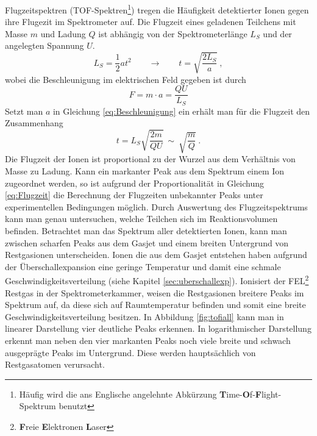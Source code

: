 Flugzeitspektren (TOF-Spektren\footnote{Häufig wird die ans Englische angelehnte Abkürzung \textbf{T}ime-\textbf{O}f-\textbf{F}light-Spektrum benutzt}) tregen die Häufigkeit detektierter Ionen gegen ihre Flugezit im Spektrometer auf. Die Flugzeit eines geladenen Teilchens mit Masse $m$ und Ladung $Q$ ist abhängig von der Spektrometerlänge $L_S$ und der angelegten Spannung $U$.
\begin{equation} \label{eq:Beschleunigung}
L_S = \frac{1}{2}at^2\qquad \rightarrow \qquad t = \sqrt{\frac{2L_S}{a}} \: ,
\end{equation} 
wobei die Beschleunigung im elektrischen Feld gegeben ist durch
\begin{equation}
F = m \cdot a = \frac{QU}{L_S}
\end{equation}
Setzt man $a$ in Gleichung \ref{eq:Beschleunigung} ein erhält man für die Flugzeit den Zusammenhang 
\begin{equation} \label{eq:Flugzeit}
t = L_S \sqrt{\frac{2m}{QU}}\: \sim \: \sqrt{\frac{m}{Q}} \: .
\end{equation}
Die Flugzeit der Ionen ist proportional zu der Wurzel aus dem Verhältnis von Masse zu Ladung. Kann ein markanter Peak aus dem Spektrum einem Ion zugeordnet werden, so ist aufgrund der Proportionalität in Gleichung \ref{eq:Flugzeit} die Berechnung der Flugzeiten unbekannter Peaks unter experimentellen Bedingungen möglich. Durch Auswertung des Flugzeitspektrums kann man genau untersuchen, welche Teilchen sich im Reaktionsvolumen befinden. Betrachtet man das Spektrum aller detektierten Ionen, kann man zwischen scharfen Peaks aus dem Gasjet und einem breiten Untergrund von Restgasionen unterscheiden. Ionen die aus dem Gasjet entstehen haben aufgrund der Überschallexpansion eine geringe Temperatur und damit eine schmale Geschwindigkeitsverteilung (siehe Kapitel \ref{sec:uberschallexp}). Ionisiert der FEL\footnote{\textbf{F}reie \textbf{E}lektronen \textbf{L}aser} Restgas in der Spektrometerkammer, weisen die Restgasionen breitere Peaks im Spektrum auf, da diese sich auf Raumtemperatur befinden und somit eine breite Geschwindigkeitsverteilung besitzen. In Abbildung \ref{fig:tofiall} kann man in linearer Darstellung vier deutliche Peaks erkennen. In logarithmischer Darstellung erkennt man neben den vier markanten Peaks noch viele breite und schwach ausgeprägte Peaks im Untergrund. Diese werden hauptsächlich von Restgasatomen verursacht.

